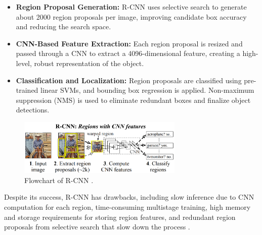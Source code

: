 \begin{itemize}
    \item \textbf{Region Proposal Generation:} R-CNN uses selective search to generate about 2000 region proposals per image, improving candidate box accuracy and reducing the search space.
    \item \textbf{CNN-Based Feature Extraction:} Each region proposal is resized and passed through a CNN to extract a 4096-dimensional feature, creating a high-level, robust representation of the object.
    \item \textbf{Classification and Localization:} Region proposals are classified using pre-trained linear SVMs, and bounding box regression is applied. Non-maximum suppression (NMS) is used to eliminate redundant boxes and finalize object detections.
\end{itemize}

\begin{figure}[H] %
    \centering
    \includegraphics[width=0.7\textwidth]{chapters/chapter1/images/Figure17.png}
    \caption{Flowchart of R-CNN \parencite{zhao2019objectdetection}.}
    \label{fig:figure17}
\end{figure}

Despite its success, R-CNN has drawbacks, including slow inference due to CNN computation for each region, time-consuming multistage training, high memory and storage requirements for storing region features, and redundant region proposals from selective search that slow down the process \parencite{zhao2019objectdetection}.





